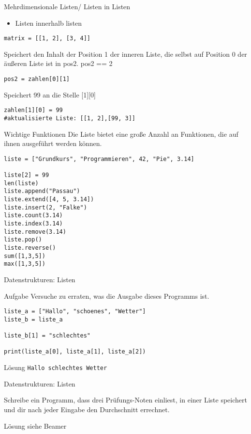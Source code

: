 \begin{frame}[fragile]{Mehrdimensionale Listen/ Listen in Listen}
\begin{itemize}
	\item Listen innerhalb listen	
\end{itemize}
\begin{lstlisting}
matrix = [[1, 2], [3, 4]]
\end{lstlisting}
Speichert den Inhalt der Position 1 der inneren Liste, die selbst auf Position 0 der {\"a}u{\ss}eren Liste ist in pos2. pos2 == 2
\begin{lstlisting}
pos2 = zahlen[0][1]
\end{lstlisting}
Speichert 99 an die Stelle [1][0]
\begin{lstlisting}
zahlen[1][0] = 99
#aktualisierte Liste: [[1, 2],[99, 3]]
\end{lstlisting}
\end{frame}



\begin{frame}[fragile]{Wichtige Funktionen}
Die Liste bietet eine große Anzahl an  Funktionen, die auf ihnen
ausgeführt werden können.

\begin{lstlisting}
liste = ["Grundkurs", "Programmieren", 42, "Pie", 3.14]

liste[2] = 99
len(liste)
liste.append("Passau")
liste.extend([4, 5, 3.14])
liste.insert(2, "Falke")
liste.count(3.14)
liste.index(3.14)
liste.remove(3.14)
liste.pop()
liste.reverse()
sum([1,3,5])
max([1,3,5])
\end{lstlisting}
\end{frame}


\begin{frame}[fragile]{Datenstrukturen: Listen}
\begin{block}{Aufgabe}
Versuche zu erraten, was die Ausgabe dieses Programms ist.
\end{block}

\begin{lstlisting}
liste_a = ["Hallo", "schoenes", "Wetter"]
liste_b = liste_a

liste_b[1] = "schlechtes"

print(liste_a[0], liste_a[1], liste_a[2])  
\end{lstlisting}
\pause{}
\begin{exampleblock}{Lösung}
    \texttt{Hallo schlechtes Wetter}
\end{exampleblock}
\end{frame}

\begin{frame}[fragile]{Datenstrukturen: Listen}

Schreibe ein Programm, dass drei Prüfungs-Noten einliest, in einer
Liste speichert und dir nach jeder Eingabe den Durchschnitt errechnet. 
\pause{}
\begin{exampleblock}{Lösung}
siehe Beamer
\end{exampleblock}
\end{frame}

